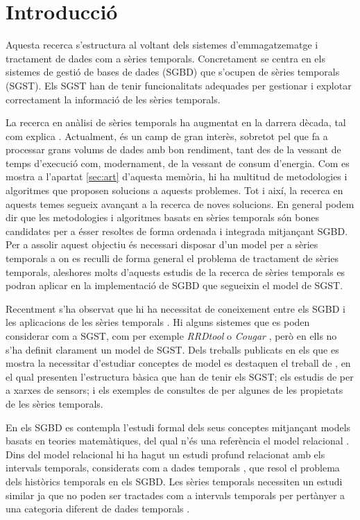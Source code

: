 \chapter{Introducció}


Aquesta recerca s'estructura al voltant dels sistemes d'emmagatzematge
i tractament de dades com a sèries temporals.  Concretament se centra
en els sistemes de gestió de bases de dades (SGBD) que s'ocupen de
sèries temporals (SGST). Els SGST han de tenir funcionalitats
adequades per gestionar i explotar correctament la informació de les
sèries temporals.

La recerca en anàlisi de sèries temporals ha augmentat en la darrera
dècada, tal com explica \textcite{fu11}. Actualment, és un camp de
gran interès, sobretot pel que fa a processar grans volums de dades
amb bon rendiment, tant des de la vessant de temps d'execució com,
modernament, de la vessant de consum d'energia. Com es mostra a
l'apartat \ref{sec:art} d'aquesta memòria, hi ha multitud de
metodologies i algoritmes que proposen solucions a aquests problemes.
Tot i així, la recerca en aquests temes segueix avançant a la recerca
de noves solucions. En general podem dir que les metodologies i
algoritmes basats en sèries temporals són bones candidates per a ésser
resoltes de forma ordenada i integrada mitjançant SGBD. Per a assolir
aquest objectiu és necessari disposar d'un model per a sèries
temporals a on es reculli de forma general el problema de tractament
de sèries temporals, aleshores molts d'aquests estudis de la recerca
de sèries temporals es podran aplicar en la implementació de SGBD que
segueixin el model de SGST.


Recentment s'ha observat que hi ha necessitat de coneixement entre els
SGBD i les aplicacions de les sèries
temporals \parencite{stonebraker09:scidb,zhang11}.  Hi alguns sistemes
que es poden considerar com a SGST, com per exemple
\emph{RRDtool} \parencite{rrdtool} o \emph{Cougar} \parencite{cougar},
però en ells no s'ha definit clarament un model de SGST.  Dels
treballs publicats en els que es mostra la necessitar d'estudiar
conceptes de model es destaquen el treball de \textcite{dreyer94}, en
el qual presenten l'estructura bàsica que han de tenir els SGST; els
estudis de \textcite{bonnet01} per a xarxes de sensors; i els exemples
de consultes de \textcite{zhang11} per algunes de les propietats de
les sèries temporals.

En els SGBD es contempla l'estudi formal dels seus conceptes
mitjançant models basats en teories matemàtiques, del qual n'és una
referència el model relacional \parencite{date:introduction}.  Dins
del model relacional hi ha hagut un estudi profund relacionat amb els
intervals temporals, considerats com a dades
temporals \parencite{date02:_tempor_data_relat_model}, que resol el
problema dels històrics temporals en els SGBD. Les sèries temporals
necessiten un estudi similar ja que no poden ser tractades com a
intervals temporals per pertànyer a una categoria diferent de dades
temporals \parencite{assfalg08:thesis,schmidt95}.













